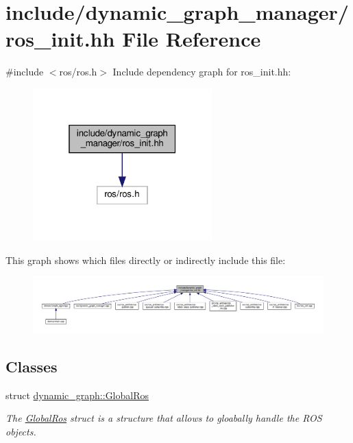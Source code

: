 \hypertarget{ros__init_8hh}{}\section{include/dynamic\+\_\+graph\+\_\+manager/ros\+\_\+init.hh File Reference}
\label{ros__init_8hh}
{\ttfamily \#include $<$ros/ros.\+h$>$}\newline
Include dependency graph for ros\+\_\+init.\+hh\+:
\nopagebreak
\begin{figure}[H]
\begin{center}
\leavevmode
\includegraphics[width=196pt]{ros__init_8hh__incl}
\end{center}
\end{figure}
This graph shows which files directly or indirectly include this file\+:
\nopagebreak
\begin{figure}[H]
\begin{center}
\leavevmode
\includegraphics[width=350pt]{ros__init_8hh__dep__incl}
\end{center}
\end{figure}
\subsection*{Classes}
\begin{DoxyCompactItemize}
\item 
struct \hyperlink{structdynamic__graph_1_1GlobalRos}{dynamic\+\_\+graph\+::\+Global\+Ros}
\begin{DoxyCompactList}\small\item\em The \hyperlink{structdynamic__graph_1_1GlobalRos}{Global\+Ros} struct is a structure that allows to gloabally handle the R\+OS objects. \end{DoxyCompactList}\end{DoxyCompactItemize}
